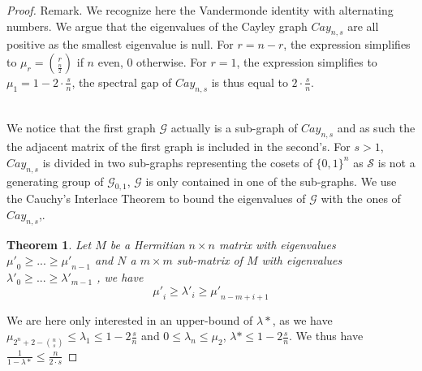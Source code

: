 \documentclass[USenglish,oneside,twocolumn]{article}
\newtheorem{theorem}{Theorem}
\begin{document}
\begin{proof}
Remark. We recognize here the Vandermonde identity with alternating numbers. We argue that the eigenvalues of the Cayley graph $Cay_{n,s}$ are all positive as the smallest eigenvalue is null.
For $r=n-r$, the expression simplifies to $\mu_r = {r \choose \frac{n}{2}}$ if $n$ even, 0 otherwise.
For $r=1$, the expression simplifies to $\mu_1 = 1 - 2\cdot \frac{s}{n}$, the spectral gap of $Cay_{n,s}$ is thus equal to $2\cdot \frac{s}{n}$.\\\

We notice that the first graph $\mathcal{G}$ actually is a sub-graph of $Cay_{n,s}$ and as such the the adjacent matrix of the first graph is included in the second's.
For $s>1$, $Cay_{n,s}$ is divided in two sub-graphs representing the cosets of $\{0,1\}^n$ as $\mathcal{S}$ is not a generating group of $\mathcal{G}_{0,1}$, $\mathcal{G}$ is only contained in one of the sub-graphs.
We use the Cauchy's Interlace Theorem to bound the eigenvalues of $\mathcal{G}$ with the ones of $Cay_{n,s}$,.

\begin{theorem}
Let $M$ be a Hermitian $n \times n$ matrix with eigenvalues ${\mu'}_0\geq ... \geq {\mu'}_{n-1}$ and $N$ a $m \times m$ sub-matrix of $M$ with eigenvalues ${\lambda'}_0\geq ... \geq {\lambda'}_{m-1}$ , we have
$$ {\mu'}_i \geq {\lambda'}_i \geq {\mu'}_{n-m+i+1} $$
\end{theorem}

We are here only interested in an upper-bound of $\lambda*$, as we have $\mu_{2^n+2-{n \choose s}}\leq \lambda_1\leq 1-2\frac{s}{n}$ and $0 \leq \lambda_n \leq \mu_2$, $\lambda* \leq 1-2\frac{s}{n}$. We thus have $\frac{1}{1-\lambda*}\leq\frac{n}{2\cdot s}$
\end{proof}
\end{document}
